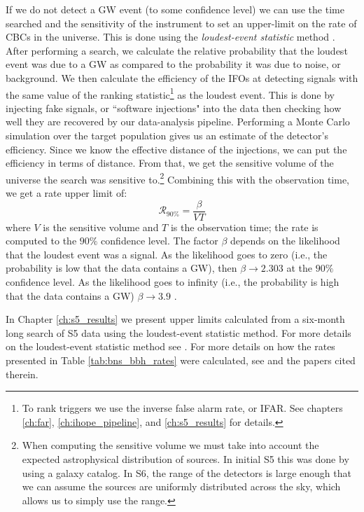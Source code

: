 If we do not detect a \ac{GW} event (to some confidence level) we can use the time searched and the sensitivity of the instrument to set an upper-limit on the rate of \acp{CBC} in the universe. This is done using the \emph{loudest-event statistic} method \cite{Fairhurst:2007qj,loudestGWDAW03,Biswas:2007ni}. After performing a search, we calculate the relative probability that the loudest event was due to a \ac{GW} as compared to the probability it was due to noise, or background. We then calculate the efficiency of the \acp{IFO} at detecting signals with the same value of the ranking statistic\footnote{To rank triggers we use the inverse false alarm rate, or IFAR. See chapters \ref{ch:far}, \ref{ch:ihope_pipeline}, and \ref{ch:s5_results} for details.} as the loudest event. This is done by injecting fake signals, or ``software injections" into the data then checking how well they are recovered by our data-analysis pipeline. Performing a Monte Carlo simulation over the target population gives us an estimate of the detector's efficiency. Since we know the effective distance of the injections, we can put the efficiency in terms of distance. From that, we get the sensitive volume of the universe the search was sensitive to.\footnote{When computing the sensitive volume we must take into account the expected astrophysical distribution of sources. In initial \ac{S5} this was done by using a galaxy catalog. In \ac{S6}, the range of the detectors is large enough that we can assume the sources are uniformly distributed across the sky, which allows us to simply use the range.} Combining this with the observation time, we get a rate upper limit of:
\begin{equation}
\label{eqn:rate_ul}
\mathcal{R}_{90\%} = \frac{\beta}{VT}
\end{equation}
where $V$ is the sensitive volume and $T$ is the observation time; the rate is computed to the $90\%$ confidence level. The factor $\beta$ depends on the likelihood that the loudest event was a signal. As the likelihood goes to zero (i.e., the probability is low that the data contains a \ac{GW}), then $\beta \rightarrow 2.303$ at the $90\%$ confidence level. As the likelihood goes to infinity (i.e., the probability is high that the data contains a \ac{GW}) $\beta \rightarrow 3.9$ \cite{Fairhurst:2007qj,loudestGWDAW03,Biswas:2007ni}.

In Chapter \ref{ch:s5_results} we present upper limits calculated from a six-month long search of \ac{S5} data using the loudest-event statistic method. For more details on the loudest-event statistic method see \cite{Fairhurst:2007qj,loudestGWDAW03,Biswas:2007ni}. For more details on how the rates presented in Table \ref{tab:bns_bbh_rates} were calculated, see \cite{ratesdoc} and the papers cited therein.


